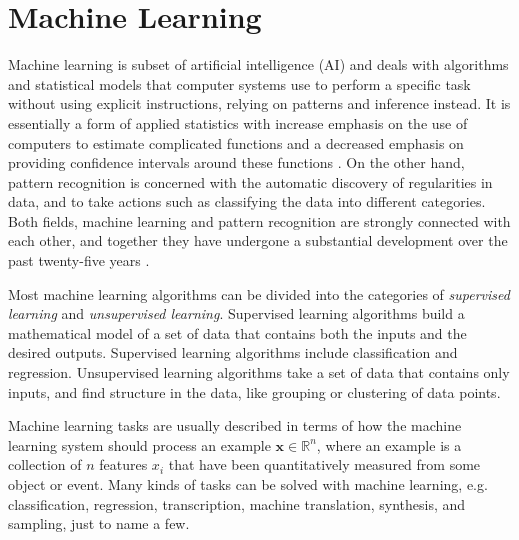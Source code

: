 \documentclass{scrartcl}
\begin{document}




\newpage

\section{Machine Learning}

Machine learning is subset of artificial intelligence (AI) and deals with algorithms and statistical models that computer systems use to perform a specific task without using explicit instructions, relying on patterns and inference instead. It is essentially a form of applied statistics with increase emphasis on the use of computers to estimate complicated functions and a decreased emphasis on providing confidence intervals around these functions \cite{Goodfellow2016}. On the other hand, pattern recognition is concerned with the automatic discovery of regularities in data, and to take actions such as classifying the data into different categories. Both fields, machine learning and pattern recognition are strongly connected with each other, and together they have undergone a substantial development over the past twenty-five years \cite{Bishop2006}.

Most machine learning algorithms can be divided into the categories of \emph{supervised learning} and \emph{unsupervised learning}. Supervised learning algorithms build a mathematical model of a set of data that contains both the inputs and the desired outputs. Supervised learning algorithms include classification and regression. Unsupervised learning algorithms take a set of data that contains only inputs, and find structure in the data, like grouping or clustering of data points. 

Machine learning tasks are usually described in terms of how the machine learning system should process an example $\mathbf x \in \mathbb R^n$, where an example is a collection of $n$ features $x_i$ that have been quantitatively measured from some object or event. Many kinds of tasks can be solved with machine learning, e.g. classification, regression, transcription, machine translation, synthesis, and sampling, just to name a few.
\end{document}
